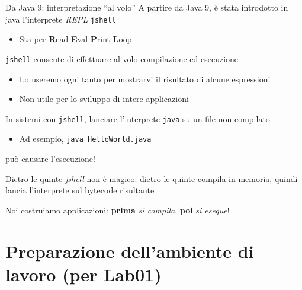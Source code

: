\documentclass[xcolor=dvipsnames,presentation]{beamer}
\begin{document}
\begin{frame}{Da Java 9: interpretazione ``al volo''}
    A partire da Java 9, è stata introdotto in java l'interprete \textit{REPL} \texttt{jshell}
    \begin{itemize}
        \item Sta per \textbf{R}ead-\textbf{E}val-\textbf{P}rint \textbf{L}oop
    \end{itemize}
    \texttt{jshell} consente di effettuare al volo compilazione ed esecuzione
    \begin{itemize}
        \item Lo useremo ogni tanto per mostrarvi il risultato di alcune espressioni
        \item Non utile per lo sviluppo di intere applicazioni
    \end{itemize}
    In sistemi con \texttt{jshell}, lanciare l'interprete \texttt{java} su un file non compilato
    \begin{itemize}
        \item Ad esempio, \texttt{java HelloWorld.java}
    \end{itemize}
    può causare l'esecuzione!
    \begin{block}{Dietro le quinte}
        \textit{jshell} non è magico: dietro le quinte compila in memoria, quindi lancia l'interprete sul bytecode risultante
    \end{block}
    Noi costruiamo applicazioni: \textbf{prima} \textit{si compila}, \textbf{poi} \textit{si esegue}!
\end{frame}

\section{Preparazione dell'ambiente di lavoro (per Lab01)}

\end{document}
